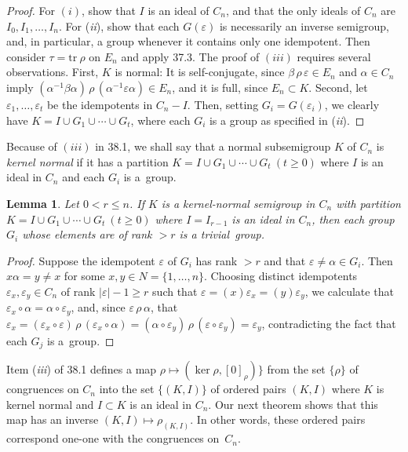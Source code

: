 \documentclass{surv-l}
\numberwithin{equation}{section}
\numberwithin{table}{section}
\numberwithin{figure}{section}
\newtheorem{lemma}[equation]{Lemma}
\theoremstyle{definition}
\begin{document}
\begin{proof} For $(i)$, show that $I$ is an ideal of $C_{n}$, and that the
only ideals of $C_{n}$ are $I_{0}, I_{1},\ldots, I_{n}$. For
(\emph{ii}), show that each $G(\varepsilon)$ is necessarily an
inverse semigroup, and, in particular, a group whenever it
contains only one idempotent. Then consider $\tau = \mathrm{tr}
\ \rho$ on $E_{n}$ and apply 37.3. The proof of $(iii)$ requires
several observations. First, $K$ is normal: It is self-conjugate,
since $\beta\,\rho\,\varepsilon\in E_{n}$ and $\alpha\in C_{n}$ imply
$(\alpha^{-1}\beta\alpha)\,\rho\,(\alpha^{-1}\varepsilon\alpha)\in
E_{n}$, and it is full, since $E_{n}\subset K$. Second, let
$\varepsilon_{1},\ldots, \varepsilon_{t}$ be the idempotents in
$C_{n}- I$. Then, setting $G_{i}=G(\varepsilon_{i})$, we clearly
have $K=I\cup G_{1}\cup\cdots\cup G_{t}$, where each $G_{i}$ is a
group as specified in (\emph{ii}).
\end{proof}

Because of $(iii)$ in 38.1, we shall say that a normal
subsemigroup $K$ of $C_{n}$ is \emph{kernel normal} if it has a
partition $K=I \cup G_{1}\cup\cdots\cup G_{t}\ (t\geq 0)$ where $I$ is
an ideal in $C_{n}$ and each $G_{i}$ is a~group.

\begin{lemma}\label{8.38.2}
Let $0<r\leq n$. If $K$ is a kernel-normal semigroup in $C_{n}$
with partition $K=I \cup G_{1}\cup\cdots\cup G_{t}\ (t\geq 0)$ where
$I =I_{r-1}$ is an ideal in $C_{n}$, then each group $G_{i}$ whose
elements are of rank $>r$ is a trivial~group.
\end{lemma}

\begin{proof} Suppose the idempotent $\varepsilon$ of $G_{i}$ has rank $>r$
and that $\varepsilon \neq\alpha\in G_{i}$. Then $x\alpha=y \neq
x$ for some $x, y\in N=\{1,\ldots, n\}$. Choosing distinct
idempotents $\varepsilon_{x}, \varepsilon_{y}\in C_{n}$ of rank
$|\varepsilon|-1\geq r$ such that
$\varepsilon=(x)\varepsilon_{x}=(y)\varepsilon_{y}$, we calculate
that $\varepsilon_{x}\circ\alpha=\alpha\circ\varepsilon_{y}$, and,
since $\varepsilon\,\rho\,\alpha$, that
$\varepsilon_{x}=(\varepsilon_{x}\circ
\varepsilon)\,\rho\,(\varepsilon_{x}\circ \alpha)
=(\alpha\circ\varepsilon_{y})\,\rho\,(\varepsilon
\circ\varepsilon_{y})=\varepsilon_{y}$, contradicting the fact that
each $G_{j}$ is a~group.
\end{proof}

Item (\emph{iii}) of 38.1 defines a map $\rho\mapsto(\ker \rho, [0]_{\rho})\}$ from the set $\{\rho\}$ of congruences on
$C_{n}$ into the set $\{(K,I)\}$ of ordered pairs $(K, I)$ where
$K$ is kernel normal and $I \subset K$ is an ideal in $C_{n}$. Our
next theorem shows that this map has an inverse $(K, I)
\mapsto\rho_{(K,I)}$. In other words, these ordered pairs
correspond one-one with the congruences on~$C_{n}$.
\end{document}

